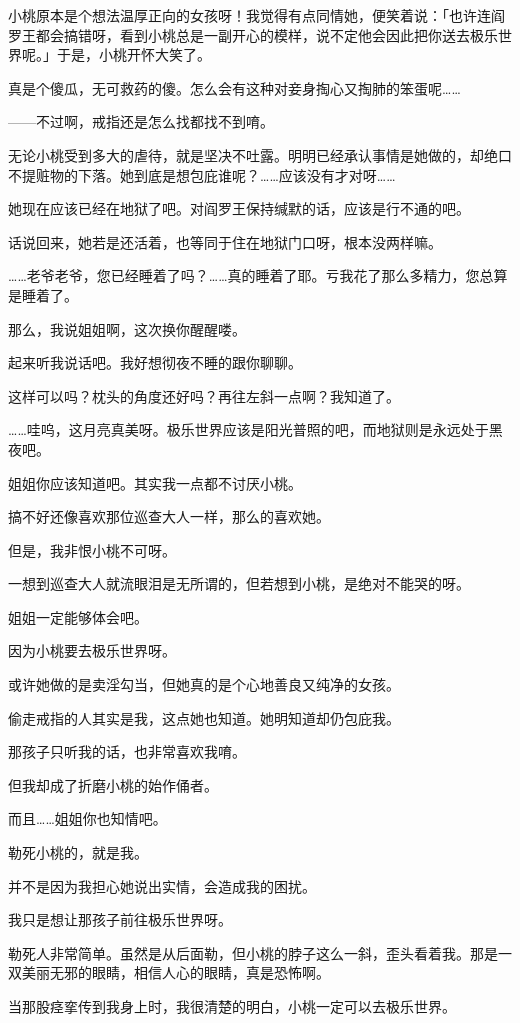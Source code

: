 \documentclass[portrait,a4paper]{article}
\begin{document}
小桃原本是个想法温厚正向的女孩呀！我觉得有点同情她，便笑着说：「也许连阎罗王都会搞错呀，看到小桃总是一副开心的模样，说不定他会因此把你送去极乐世界呢。」于是，小桃开怀大笑了。

真是个傻瓜，无可救药的傻。怎么会有这种对妾身掏心又掏肺的笨蛋呢……

——不过啊，戒指还是怎么找都找不到唷。

无论小桃受到多大的虐待，就是坚决不吐露。明明已经承认事情是她做的，却绝口不提赃物的下落。她到底是想包庇谁呢？……应该没有才对呀……

她现在应该已经在地狱了吧。对阎罗王保持缄默的话，应该是行不通的吧。

话说回来，她若是还活着，也等同于住在地狱门口呀，根本没两样嘛。

……老爷老爷，您已经睡着了吗？……真的睡着了耶。亏我花了那么多精力，您总算是睡着了。

那么，我说姐姐啊，这次换你醒醒喽。

起来听我说话吧。我好想彻夜不睡的跟你聊聊。

这样可以吗？枕头的角度还好吗？再往左斜一点啊？我知道了。

……哇呜，这月亮真美呀。极乐世界应该是阳光普照的吧，而地狱则是永远处于黑夜吧。

姐姐你应该知道吧。其实我一点都不讨厌小桃。

搞不好还像喜欢那位巡查大人一样，那么的喜欢她。

但是，我非恨小桃不可呀。

一想到巡查大人就流眼泪是无所谓的，但若想到小桃，是绝对不能哭的呀。

姐姐一定能够体会吧。

因为小桃要去极乐世界呀。

或许她做的是卖淫勾当，但她真的是个心地善良又纯净的女孩。

偷走戒指的人其实是我，这点她也知道。她明知道却仍包庇我。

那孩子只听我的话，也非常喜欢我唷。

但我却成了折磨小桃的始作俑者。

而且……姐姐你也知情吧。

勒死小桃的，就是我。

并不是因为我担心她说出实情，会造成我的困扰。

我只是想让那孩子前往极乐世界呀。

勒死人非常简单。虽然是从后面勒，但小桃的脖子这么一斜，歪头看着我。那是一双美丽无邪的眼睛，相信人心的眼睛，真是恐怖啊。

当那股痉挛传到我身上时，我很清楚的明白，小桃一定可以去极乐世界。
\end{document}
